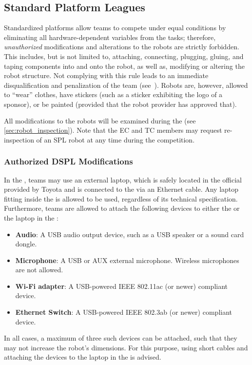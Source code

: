\subsection{Standard Platform Leagues}

Standardized platforms allow teams to compete under equal conditions by eliminating all hardware-dependent variables from the tasks; therefore, \emph{unauthorized} modifications and alterations to the robots are strictly forbidden.
This includes, but is not limited to, attaching, connecting, plugging, gluing, and taping components into and onto the robot, as well as, modifying or altering the robot structure.
Not complying with this rule leads to an immediate disqualification and penalization of the team (see~).
Robots are, however, allowed to \enquote{wear} clothes, have stickers (such as a sticker exhibiting the logo of a sponsor), or be painted (provided that the robot provider has approved that).

All modifications to the robots will be examined during the \RobotInspection{} (see \ref{sec:robot_inspection}).
Note that the EC and TC members may request re-inspection of an SPL robot at any time during the competition.

\subsubsection{Authorized DSPL Modifications}
\label{rule:osl_dspl}

In the \DSPL{}, teams may use an external laptop, which is safely located in the official \MountingBracket{} provided by Toyota and is connected to the \HSR{} via an Ethernet cable.
Any laptop fitting inside the \MountingBracket{} is allowed to be used, regardless of its technical specification.
Furthermore, teams are allowed to attach the following devices to either the \HSR{} or the laptop in the \MountingBracket:
\begin{itemize}
	\item \textbf{Audio}: A USB audio output device, such as a USB speaker or a sound card dongle.
	    \item \textbf{Microphone}: A USB or AUX external microphone. Wireless microphones are not allowed.
	\item \textbf{Wi-Fi adapter}: A USB-powered IEEE 802.11ac (or newer) compliant device.
	\item \textbf{Ethernet Switch}: A USB-powered IEEE 802.3ab (or newer) compliant device.
\end{itemize}
In all cases, a maximum of three such devices can be attached, such that they may not increase the robot's dimensions.
For this purpose, using short cables and attaching the devices to the laptop in the \MountingBracket{} is advised.

